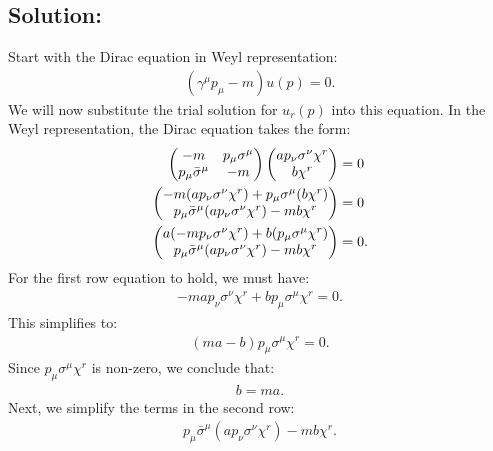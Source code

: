 \begin{enumerate}
    \subsection*{Solution:}
    Start with the Dirac equation in Weyl representation:
    \begin{align}
        (\gamma^\mu p_\mu - m) u(p) = 0.
    \end{align}
    We will now substitute the trial solution for $u_r(p)$ into this equation. In the Weyl representation, the Dirac equation takes the form:
    \begin{align*}
        \begin{pmatrix}
        -m & p_\mu \sigma^\mu \\
        p_\mu \bar{\sigma}^\mu & -m
        \end{pmatrix}
        \begin{pmatrix}
        a p_\nu \sigma^\nu \chi^r \\
        b \chi^r
        \end{pmatrix}
        &= 0\notag\\
        \begin{pmatrix}
        -m (a p_\nu \sigma^\nu \chi^r) + p_\mu \sigma^\mu (b \chi^r) \\
        p_\mu \bar{\sigma}^\mu (a p_\nu \sigma^\nu \chi^r) - m b \chi^r 
        \end{pmatrix}&= 0\notag\\
        \begin{pmatrix}
        a (-m p_\nu \sigma^\nu \chi^r) + b (p_\mu \sigma^\mu \chi^r) \\
        p_\mu \bar{\sigma}^\mu (a p_\nu \sigma^\nu \chi^r) - m b \chi^r 
        \end{pmatrix}&= 0.
    \end{align*}
    For the first row equation to hold, we must have:
    \begin{align*}
        -m a p_\nu \sigma^\nu \chi^r + b p_\mu \sigma^\mu \chi^r = 0.
    \end{align*}
    This simplifies to:
    \begin{align*}
        (m a - b) p_\mu \sigma^\mu \chi^r = 0.
    \end{align*}
    Since $p_\mu \sigma^\mu \chi^r$ is non-zero, we conclude that:
    \begin{align*}
        b = ma.
    \end{align*}
    Next, we simplify the terms in the second row:
    \begin{align*}
        p_\mu \bar{\sigma}^\mu (a p_\nu \sigma^\nu \chi^r) - m b \chi^r.

\end{align*}
\end{enumerate}
